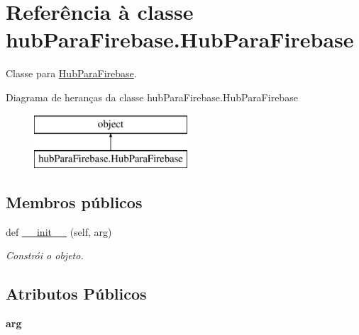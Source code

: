 \hypertarget{classhub_para_firebase_1_1_hub_para_firebase}{}\section{Referência à classe hub\+Para\+Firebase.\+Hub\+Para\+Firebase}
\label{classhub_para_firebase_1_1_hub_para_firebase}


Classe para \hyperlink{classhub_para_firebase_1_1_hub_para_firebase}{Hub\+Para\+Firebase}.  


Diagrama de heranças da classe hub\+Para\+Firebase.\+Hub\+Para\+Firebase\begin{figure}[H]
\begin{center}
\leavevmode
\includegraphics[height=2.000000cm]{classhub_para_firebase_1_1_hub_para_firebase}
\end{center}
\end{figure}
\subsection*{Membros públicos}
\begin{DoxyCompactItemize}
\item 
def \hyperlink{classhub_para_firebase_1_1_hub_para_firebase_a2125568a783092a9463703c03cbfe9d6}{\+\_\+\+\_\+init\+\_\+\+\_\+} (self, arg)
\begin{DoxyCompactList}\small\item\em Constrói o objeto. \end{DoxyCompactList}\end{DoxyCompactItemize}
\subsection*{Atributos Públicos}
\begin{DoxyCompactItemize}
\item 
{\bfseries arg}\hypertarget{classhub_para_firebase_1_1_hub_para_firebase_a0147b280486ae5e9f28cfb8c4eb3ff36}{}\label{classhub_para_firebase_1_1_hub_para_firebase_a0147b280486ae5e9f28cfb8c4eb3ff36}

\end{DoxyCompactItemize}


